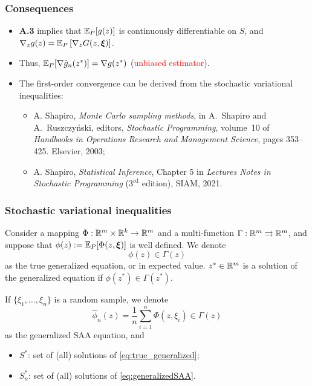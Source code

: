 \documentclass{beamer}
\def\bxi{\boldsymbol\xi}
\begin{document}
\begin{frame}
\frametitle{Consequences}

\begin{itemize}
\item 
\textbf{A.3} implies that ${\mathbb{E}}_P[g(z)]$ is continuously differentiable on $S$, and
$\nabla_z g(z) = \EE_P\left[ \nabla_z G(z, \bxi) \right]$.
\item
Thus, ${\mathbb{E}}_P [\nabla \hat{g}_n(z^*)] = \nabla g( z^*)$ (\textcolor{red}{unbiased estimator}).
\item
The {\blue first-order convergence} can be derived from the stochastic variational inequalities:
\begin{itemize}
	\item 
A. Shapiro, {\sl Monte Carlo sampling methods},
in A.~Shapiro and A.~Ruszczy\'nski, editors, {\sl Stochastic Programming}, volume~10 of {\sl Handbooks in Operations Research and Management Science}, pages 353--425. Elsevier, 2003;
\item
A. Shapiro, {\sl Statistical Inference}, Chapter 5 in {\sl Lectures Notes in Stochastic Programming} ($3^{\text{rd}}$ edition), SIAM, 2021.
\end{itemize}
\end{itemize}

\end{frame}

\begin{frame}
\frametitle{Stochastic variational inequalities}

Consider a mapping $\Phi: \mathbb{R}^m \times \mathbb{R}^k \rightarrow \mathbb{R}^m$ and a multi-function $\Gamma: \mathbb{R}^m \rightrightarrows  \mathbb{R}^m$, and suppose that $\phi(z) := \EE_{P}[\Phi(z, \bxi)]$ is well defined.
We denote
\begin{equation}
\phi(z) \in \Gamma(z)
\label{eq:true_generalized}
\end{equation}
as the true {\blue generalized equation}, or in expected value.
$z^* \in \mathbb{R}^m$ is a solution of the generalized equation if $\phi(z^*) \in \Gamma(z^*)$.

\mbox{}

If $\lbrace \xi_1,\ldots,\xi_n \rbrace$ is a random sample, we denote
\begin{equation}
\hat{\phi}_n(z) = \frac{1}{n} \sum_{i=1}^n \Phi(z,\xi_i) \in \Gamma(z)
\label{eq:generalizedSAA}
\end{equation}
as the generalized SAA equation, and
\begin{itemize}
	\item $S^*$: set of (all) solutions of \eqref{eq:true_generalized};
	\item $S^*_n$: set of (all) solutions of \eqref{eq:generalizedSAA}.
\end{itemize}

\end{frame}
\end{document}
